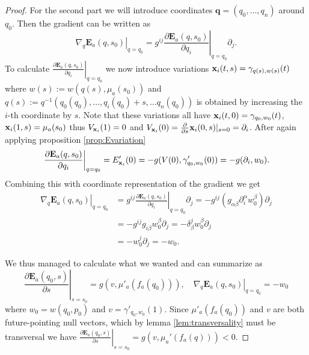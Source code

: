 \begin{proof}
    For the second part we will introduce coordinates $\mathbf{q}=(q_0,\dots,q_n)$ around $q_0$. Then the gradient can be written as
    \[
        \left.\nabla_q\mathbf{E}_a(q,s_0)\right\rvert_{q=q_0} = g^{ij}\left.\frac{\partial\mathbf{E}_a(q,s_0)}{\partial q_i}\right\rvert_{q=q_0}\partial_j.
    \]
    To calculate $\left.\frac{\partial\mathbf{E}_a(q,s_0)}{\partial q_i}\right\rvert_{q=q_0}$ we now introduce variations $\mathbf{x}_i(t,s) = \gamma_{q(s),w(s)}(t)$ where $w(s):=w(q(s),\mu_a(s_0))$ and $q(s):=q^{-1}(q_0(q_0),\dots, q_i(q_0)+s, \dots q_n(q_0))$ is obtained by increasing the $i$-th coordinate by $s$. Note that these variations all have $\mathbf{x}_i(t,0) = \gamma_{q_0,w_0}(t)$, $\mathbf{x}_i(1,s) = \mu_a(s_0)$ thus $V_{\mathbf{x}_i}(1)=0$ and $V_{\mathbf{x}_i}(0) = \frac{\partial}{\partial s}\mathbf{x}_i(0,s)\rvert_{s=0} = \partial_i$.
    After again applying proposition \ref{prop:Evariation}
    \[
        \left.\frac{\partial\mathbf{E}_a(q,s_0)}{\partial q_i}\right\rvert_{q=q_0} = E'_{\mathbf{x}_i}(0) =  -g(V(0),\gamma'_{q_0,w_0}(0)) = -g(\partial_i,w_0).
    \]
    Combining this with coordinate representation of the gradient we get
    \begin{align*}
        \left.\nabla_q\mathbf{E}_a(q,s_0)\right\rvert_{q=q_0} &= g^{ij}\left.\frac{\partial\mathbf{E}_a(q,s_0)}{\partial q_i}\right\rvert_{q=q_0}\partial_j = -g^{ij}(g_{\alpha\beta}\partial_i^\alpha w_0^\beta)\partial_j\\
        &= -g^{ij}g_{i\beta}w_0^\beta\partial_j = -\delta^j_\beta w_0^\beta \partial_j\\
        &= -w_0^j\partial_j = -w_0.
    \end{align*}
    
    We thus managed to calculate what we wanted and can summarize as
    \begin{equation}\label{eq:dEsummary}
        \left.\frac{\partial\mathbf{E}_a(q_0,s)}{\partial s}\right\rvert_{s=s_0} = g(v,\mu'_a(f_a(q_0))), \quad \left.\nabla_q\mathbf{E}_a(q,s_0)\right\rvert_{q=q_0}=-w_0
    \end{equation}
    where $w_0=w(q_0,p_0)$ and $v=\gamma'_{q_0,w_0}(1)$. Since $\mu'_a(f_a(q_0))$ and $v$ are both future-pointing null vectors, which by lemma \ref{lem:transversality} must be transversal we have $\left.\frac{\partial\mathbf{E}_a(q_0,s)}{\partial s}\right\rvert_{s=s_0}=g(v,\mu_a'(f_a(q)))<0$.


\end{proof}
